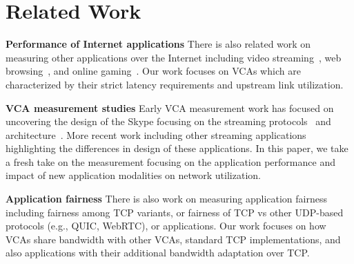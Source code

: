 \section{Related Work}\label{sec:related}
\textbf{Performance of Internet applications}
There is also related work on measuring other applications over the Internet including video streaming~\cite{}, web browsing~\cite{}, and online gaming~\cite{}. Our work focuses on VCAs which are characterized by their strict latency requirements and upstream link utilization.  

\textbf{VCA measurement studies}
Early VCA measurement work has focused on uncovering the design of the Skype focusing on the streaming protocols~\cite{guha2005experimental} and architecture~\cite{baset2004analysis, bonfiglio2008detailed, bonfiglio2008tracking}. More recent work including other streaming applications~\cite{xu2012video, nistico2020comparative} highlighting the differences in design of these applications. In this paper, we take a fresh take on the measurement focusing on the application performance and impact of new application modalities on network utilization. 


\textbf{Application fairness}
There is also work on measuring application fairness including fairness among TCP variants, or fairness of TCP vs other UDP-based protocols (e.g., QUIC, WebRTC), or applications. Our work focuses on how VCAs share bandwidth with other VCAs, standard TCP implementations, and also applications with their additional bandwidth adaptation over TCP. 

